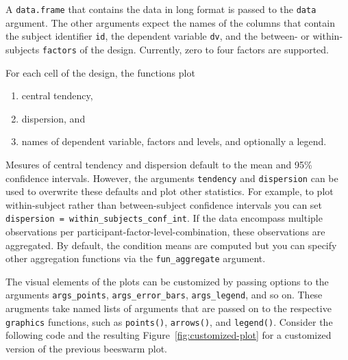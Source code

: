 \documentclass[man,floatsintext]{apa6}
\providecommand{\tightlist}{%
  \setlength{\itemsep}{0pt}\setlength{\parskip}{0pt}}
\theoremstyle{definition}
\theoremstyle{definition}
\theoremstyle{definition}
\theoremstyle{remark}
\begin{document}
A \texttt{data.frame} that contains the data in long format is passed to
the \texttt{data} argument. The other arguments expect the names of the
columns that contain the subject identifier \texttt{id}, the dependent
variable \texttt{dv}, and the between- or within-subjects
\texttt{factors} of the design. Currently, zero to four factors are
supported.

For each cell of the design, the functions plot

\begin{enumerate}
\def\labelenumi{\arabic{enumi}.}
\tightlist
\item
  central tendency,
\item
  dispersion, and
\item
  names of dependent variable, factors and levels, and optionally a
  legend.
\end{enumerate}

Mesures of central tendency and dispersion default to the mean and 95\%
confidence intervals. However, the arguments \texttt{tendency} and
\texttt{dispersion} can be used to overwrite these defaults and plot
other statistics. For example, to plot within-subject rather than
between-subject confidence intervals you can set
\texttt{dispersion\ =\ within\_subjects\_conf\_int}. If the data
encompass multiple observations per
participant-factor-level-combination, these observations are aggregated.
By default, the condition means are computed but you can specify other
aggregation functions via the \texttt{fun\_aggregate} argument.

The visual elements of the plots can be customized by passing options to
the arguments \texttt{args\_points}, \texttt{args\_error\_bars},
\texttt{args\_legend}, and so on. These arugments take named lists of
arguments that are passed on to the respective \texttt{graphics}
functions, such as \texttt{points()}, \texttt{arrows()}, and
\texttt{legend()}. Consider the following code and the resulting
Figure~\ref{fig:customized-plot} for a customized version of the
previous beeswarm plot.
\end{document}
